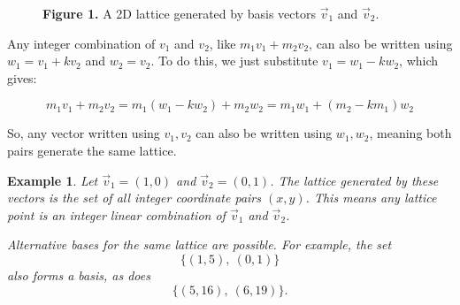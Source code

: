 \documentclass[a4paper,12pt]{article}
\newtheorem*{example}{Example}
\begin{document}
\begin{figure}[h!]
\centering
{}

\vspace{0.5em}
\textbf{Figure 1.} A 2D lattice generated by basis vectors \( \vec{v}_1  \) and \( \vec{v}_2  \).

\end{figure}


\newpage

Any integer combination of \( v_1 \) and \( v_2 \), like \( m_1 v_1 + m_2 v_2 \),  
can also be written using \( w_1 = v_1 + k v_2 \) and \( w_2 = v_2 \).  
To do this, we just substitute \( v_1 = w_1 - k w_2 \), which gives:

\[
m_1 v_1 + m_2 v_2 = m_1 (w_1 - k w_2) + m_2 w_2 = m_1 w_1 + (m_2 - k m_1) w_2
\]

So, any vector written using \( v_1, v_2 \) can also be written using \( w_1, w_2 \),  
meaning both pairs generate the same lattice.

\begin{example}
Let \( \vec{v}_1 = (1, 0) \) and \( \vec{v}_2 = (0, 1) \).  
The lattice generated by these vectors is the set of all integer coordinate pairs \( (x, y) \).  
This means any lattice point is an integer linear combination of \( \vec{v}_1 \) and \( \vec{v}_2 \).

Alternative bases for the same lattice are possible. For example, the set  
\[
\{ (1, 5),\ (0, 1) \}
\]
also forms a basis, as does  
\[
\{ (5, 16),\ (6, 19) \}.
\]


\end{example}
\end{document}
